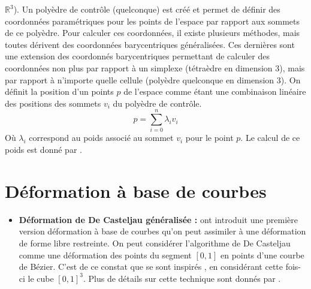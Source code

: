 \begin{itemize}
  $\mathbb{R}^3$). Un polyèdre de contrôle (quelconque) est créé et
  permet de définir des coordonnées paramétriques pour les points de
  l'espace par rapport aux sommets de ce polyèdre. Pour calculer ces
  coordonnées, il existe plusieurs méthodes, mais toutes dérivent des
  coordonnées barycentriques généralisées. Ces dernières sont une
  extension des coordonnés barycentriques permettant de calculer des
  coordonnées non plus par rapport à un simplexe (tétraèdre en
  dimension 3), mais par rapport à n'importe quelle cellule (polyèdre
  quelconque en dimension 3). On définit la position d'un points $p$
  de l'espace comme étant une combinaison linéaire des positions des
  sommets $v_i$ du polyèdre de contrôle.
  \begin{equation}
    p = \sum_{i=0}^n \lambda_iv_i
  \end{equation}
  Où $\lambda_i$ correspond au poids associé au sommet $v_i$ pour le
  point $p$. Le calcul de ce poids est donné par \cite{FKR05}.
\end{itemize}

\section{Déformation à base de courbes}
\begin{itemize}
\item{\textbf{Déformation de De Casteljau généralisée :}} \cite{CR94}
  ont introduit une première version déformation à base de courbes
  qu'on peut assimiler à une déformation de forme libre restreinte. On
  peut considérer l'algorithme de De Casteljau comme une déformation
  des points du segment $[0,1]$ en points d'une courbe de
  Bézier. C'est de ce constat que se sont inspirés \cite{CR94}, en
  considérant cette fois-ci le cube $[0,1]^3$. Plus de détails sur
  cette technique sont donnés par \cite{BE01}.
\end{itemize}

